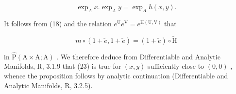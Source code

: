 \[
\exp_ {A} x. \exp_ {A} y = \exp_ {A} h (x, y).\tag{23}
\]

It follows from (18) and the relation \(e^{\mathrm{U}}e^{\mathrm{V}} = e^{\mathrm{H}(\mathrm{U},\mathrm{V})}\) that

\[
m \circ (1 + \tilde {e}, 1 + \tilde {e}) = (1 + \tilde {e}) \circ \tilde {\mathrm{H}}
\]

in \(\hat{\mathrm{P}} (\mathrm{A}\times \mathrm{A};\mathrm{A})\) . We therefore deduce from Differentiable and Analytic Manifolds, R, 3.1.9 that (23) is true for \((x,y)\) sufficiently close to \((0,0)\) , whence the proposition follows by analytic continuation (Differentiable and Analytic Manifolds, R, 3.2.5).

